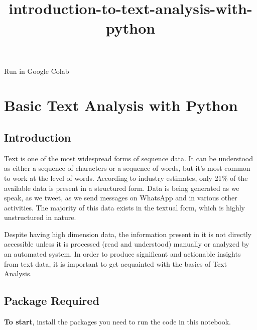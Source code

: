 \documentclass[11pt]{article}
\title{introduction-to-text-analysis-with-python}
\begin{document}
    
    \maketitle
    
    

    
    Run in Google Colab

    \hypertarget{basic-text-analysis-with-python}{%
\section{Basic Text Analysis with
Python}\label{basic-text-analysis-with-python}}

    \hypertarget{introduction}{%
\subsection{Introduction}\label{introduction}}

Text is one of the most widespread forms of sequence data. It can be
understood as either a sequence of characters or a sequence of words,
but it's most common to work at the level of words. According to
industry estimates, only 21\% of the available data is present in a
structured form. Data is being generated as we speak, as we tweet, as we
send messages on WhatsApp and in various other activities. The majority
of this data exists in the textual form, which is highly unstructured in
nature.

Despite having high dimension data, the information present in it is not
directly accessible unless it is processed (read and understood)
manually or analyzed by an automated system. In order to produce
significant and actionable insights from text data, it is important to
get acquainted with the basics of Text Analysis.

    \hypertarget{package-required}{%
\subsection{Package Required}\label{package-required}}

    \textbf{To start}, install the packages you need to run the code in this
notebook.
\end{document}
